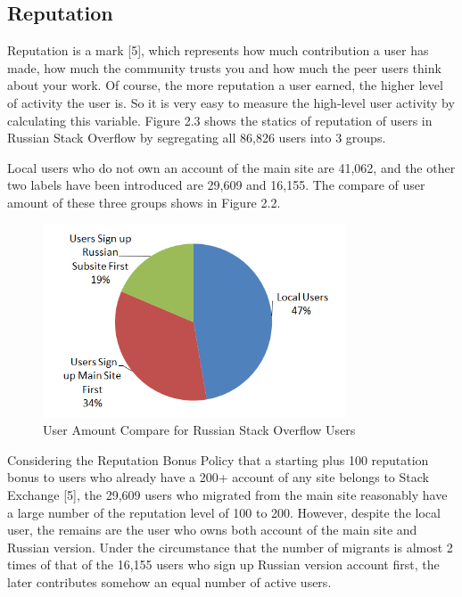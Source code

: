 \subsection{Reputation}
Reputation is a mark [5], which represents how much contribution a user has made, how much the community trusts you and how much the peer users think about your work. Of course, the more reputation a user earned, the higher level of activity the user is. So it is very easy to measure the high-level user activity by calculating this variable. Figure 2.3 shows the statics of reputation of users in Russian Stack Overflow by segregating all 86,826 users into 3 groups. 
\par
Local users who do not own an account of the main site are 41,062, and the other two labels have been introduced are 29,609 and 16,155. The compare of user amount of these three groups shows in Figure 2.2.\par
\begin{figure}[h]
	\includegraphics[width = 0.80\textwidth]{figures/pie.png}
	\caption{User Amount Compare for Russian Stack Overflow Users}
\end{figure}
Considering the Reputation Bonus Policy that a starting plus 100 reputation bonus to users who already have a 200+ account of any site belongs to Stack Exchange [5], the 29,609 users who migrated from the main site reasonably have a large number of the reputation level of 100 to 200. However, despite the local user, the remains are the user who owns both account of the main site and Russian version. Under the circumstance that the number of migrants is almost 2 times of that of the 16,155 users who sign up Russian version account first, the later contributes somehow an equal number of active users. \par
